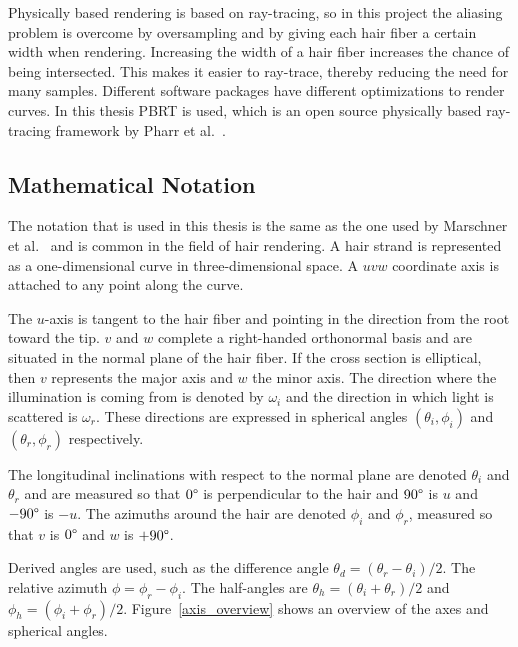 \documentclass[11pt,a4paper]{report}
\begin{document}
Physically based rendering is based on ray-tracing, so in this project the aliasing problem is overcome by oversampling and by giving each hair fiber a certain width when rendering. Increasing the width of a hair fiber increases the chance of being intersected. This makes it easier to ray-trace, thereby reducing the need for many samples. Different software packages have different optimizations to render curves. In this thesis PBRT is used, which is an open source physically based ray-tracing framework by Pharr et al.~\cite{pharr2017}.

\subsection{Mathematical Notation}
\label{sec_mathematical_notation}

The notation that is used in this thesis is the same as the one used by Marschner et al.~\cite{marschner} and is common in the field of hair rendering. A hair strand is represented as a one-dimensional curve in three-dimensional space. A $uvw$ coordinate axis is attached to any point along the curve.

The $u$-axis is tangent to the hair fiber and pointing in the direction from the root toward the tip. $v$ and $w$ complete a right-handed orthonormal basis and are situated in the normal plane of the hair fiber. If the cross section is elliptical, then  $v$ represents the major axis and $w$ the minor axis. The direction where the illumination is coming from is denoted by $\omega_i$ and the direction in which light is scattered is $\omega_r$. These directions are expressed in spherical angles $(\theta_i, \phi_i)$ and $(\theta_r,\phi_r)$ respectively.

The longitudinal inclinations with respect to the normal plane are denoted $\theta_i$ and $\theta_r$ and are measured so that $0\degree$ is perpendicular to the hair and $90\degree$ is $u$ and $-90\degree$ is $-u$. The azimuths around the hair are denoted $\phi_i$ and $\phi_r$, measured so that $v$ is $0\degree$ and $w$ is $+90\degree$.

Derived angles are used, such as the difference angle $\theta_d = (\theta_r - \theta_i)/2$. The relative azimuth $\phi = \phi_r - \phi_i$. The half-angles are $\theta_h = (\theta_i + \theta_r)/2$ and $\phi_h = (\phi_i + \phi_r)/2$. Figure~\ref{axis_overview} shows an overview of the axes and spherical angles.
\end{document}
